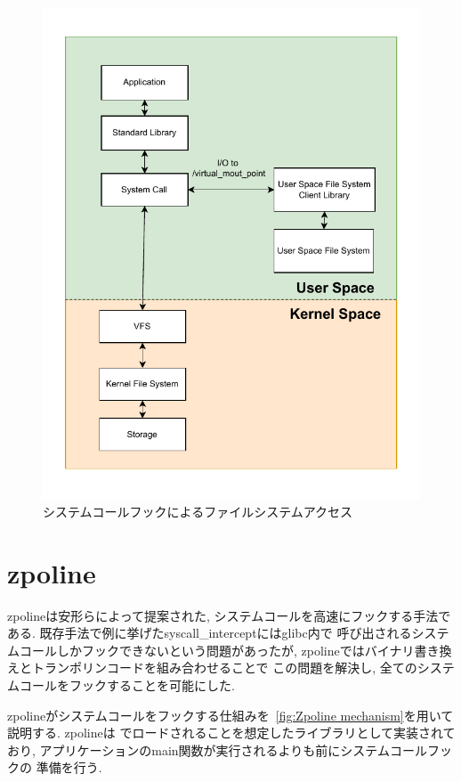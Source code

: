 \documentclass[a4paper,11pt]{jreport}
\begin{document}
\begin{figure}[h]
	\begin{minipage}[b]{1\columnwidth}
		\centering
		\includegraphics[width=0.9\linewidth]{./figure/syscall_hook_v2.pdf}
		\caption{システムコールフックによるファイルシステムアクセス}
		\label{fig:Syscall hook}
	\end{minipage}
\end{figure}

\section{zpoline}
zpolineは安形らによって提案された, システムコールを高速にフックする手法である. 既存手法で例に挙げたsyscall\_interceptにはglibc内で
呼び出されるシステムコールしかフックできないという問題があったが, zpolineではバイナリ書き換えとトランポリンコードを組み合わせることで
この問題を解決し, 全てのシステムコールをフックすることを可能にした.

zpolineがシステムコールをフックする仕組みを\figurename~\ref{fig:Zpoline mechanism}を用いて説明する. zpolineは
でロードされることを想定したライブラリとして実装されており, アプリケーションのmain関数が実行されるよりも前にシステムコールフックの
準備を行う. 
\end{document}
